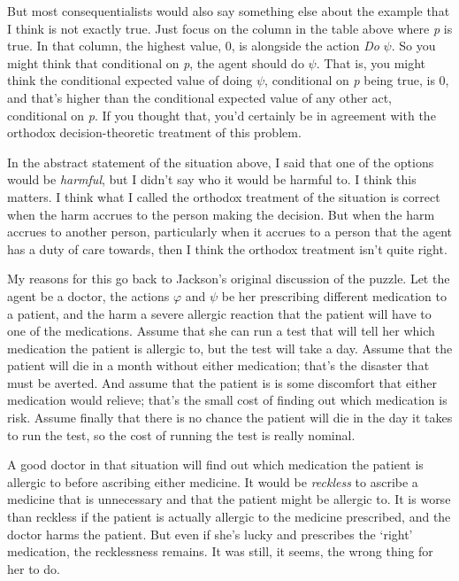 \documentclass[
  10pt,
  letterpaper,
  DIV=11,
  numbers=noendperiod,
  twoside]{scrartcl}
\begin{document}
But most consequentialists would also say something else about the
example that I think is not exactly true. Just focus on the column in
the table above where \emph{p} is true. In that column, the highest
value, 0, is alongside the action \emph{Do} \(\psi\). So you might think
that conditional on \emph{p}, the agent should do \(\psi\). That is, you
might think the conditional expected value of doing \(\psi\),
conditional on \emph{p} being true, is 0, and that's higher than the
conditional expected value of any other act, conditional on \emph{p}. If
you thought that, you'd certainly be in agreement with the orthodox
decision-theoretic treatment of this problem.

In the abstract statement of the situation above, I said that one of the
options would be \emph{harmful}, but I didn't say who it would be
harmful to. I think this matters. I think what I called the orthodox
treatment of the situation is correct when the harm accrues to the
person making the decision. But when the harm accrues to another person,
particularly when it accrues to a person that the agent has a duty of
care towards, then I think the orthodox treatment isn't quite right.

My reasons for this go back to Jackson's original discussion of the
puzzle. Let the agent be a doctor, the actions \(\varphi\) and \(\psi\)
be her prescribing different medication to a patient, and the harm a
severe allergic reaction that the patient will have to one of the
medications. Assume that she can run a test that will tell her which
medication the patient is allergic to, but the test will take a day.
Assume that the patient will die in a month without either medication;
that's the disaster that must be averted. And assume that the patient is
is some discomfort that either medication would relieve; that's the
small cost of finding out which medication is risk. Assume finally that
there is no chance the patient will die in the day it takes to run the
test, so the cost of running the test is really nominal.

A good doctor in that situation will find out which medication the
patient is allergic to before ascribing either medicine. It would be
\emph{reckless} to ascribe a medicine that is unnecessary and that the
patient might be allergic to. It is worse than reckless if the patient
is actually allergic to the medicine prescribed, and the doctor harms
the patient. But even if she's lucky and prescribes the `right'
medication, the recklessness remains. It was still, it seems, the wrong
thing for her to do.
\end{document}
